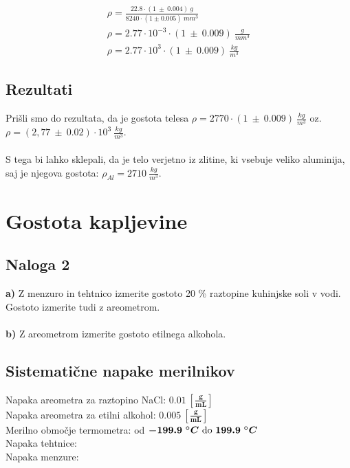 \documentclass{report}
\begin{document}
\begin{equation}
  \label{eq:1}
  \begin{gathered}
    \rho = \frac{22.8 \cdot (1 \ \pm \ 0.004)\ g}{8240 \cdot (1 \pm 0.005) \ mm^3} \\
    \rho = 2.77 \cdot 10^{-3} \cdot (1 \ \pm \ 0.009) \ \frac{g}{mm^3} \\
    \rho = 2.77 \cdot 10^3 \cdot (1 \ \pm \ 0.009) \ \frac{kg}{m^3}
  \end{gathered}
\end{equation}

\subsection{Rezultati}
Prišli smo do rezultata, da je gostota telesa $\rho = 2770 \cdot (1 \ \pm \ 0.009) \ \frac{kg}{m^3}$ oz. 
$\rho = (2,77 \ \pm \ 0.02) \cdot 10^3 \ \frac{kg}{m^3}$.
\\\\
S tega bi lahko sklepali, da je telo verjetno iz zlitine, ki vsebuje veliko aluminija, saj je njegova gostota: 
$\rho_{Al} = 2710 \ \frac{kg}{m^3}$.


\pagebreak

\section{Gostota kapljevine}
\subsection{Naloga 2}
\textbf{a)} Z menzuro in tehtnico izmerite gostoto 20 \% raztopine kuhinjske soli v vodi. Gostoto izmerite tudi z areometrom.\\\\
\textbf{b)} Z areometrom izmerite gostoto etilnega alkohola.

\subsection{Sistematične napake merilnikov}
Napaka areometra za raztopino NaCl: $\bm{0.01 \ \left[ \frac{g}{mL} \right]}$ \\
Napaka areometra za etilni alkohol: $\bm{0.005 \ \left[ \frac{g}{mL} \right]}$ \\
Merilno območje termometra: od $\bm{-199.9\ ^{\circ}C$} do \bm{$199.9\ ^{\circ}C}$ \\
Napaka tehtnice:  \\
Napaka menzure: 
\\
\end{document}
